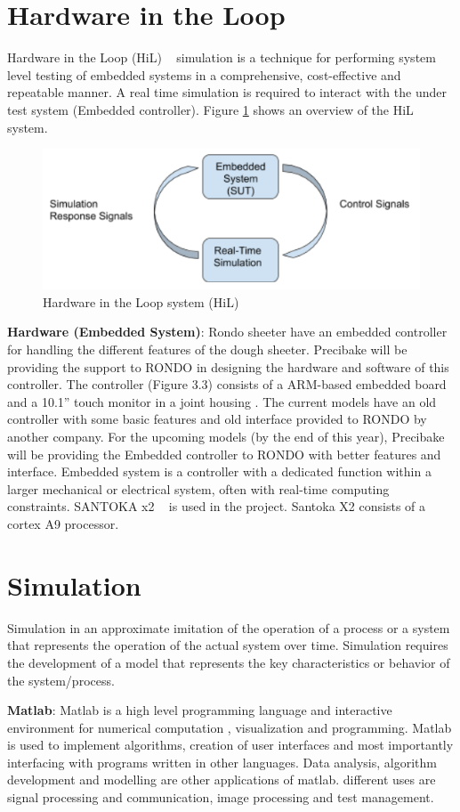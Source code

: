\documentclass{listhesis}
\begin{document}
\section{Hardware in the Loop} Hardware in the Loop (HiL) ~\cite{hil} simulation is a technique for performing system level testing of embedded systems in a comprehensive, cost-effective and repeatable manner. A real time simulation is required to interact with the under test system (Embedded controller). Figure \ref{fig:hil} shows an overview of the HiL system. 
\begin{figure}[h!]


  \includegraphics[width=0.7\linewidth]{hil.png}
  \centering
  \caption{Hardware in the Loop system (HiL)}
  \label{fig:hil}
\end{figure}
\par

\textbf{Hardware (Embedded System)}: Rondo sheeter have an embedded controller for handling the different features of the dough sheeter. Precibake will be providing the support to RONDO in designing the hardware and software of this controller. The controller (Figure 3.3) consists of a ARM-based embedded board and a 10.1” touch monitor in a joint housing . The current models have an old controller with some basic features and old interface provided to RONDO by another company. For the upcoming models (by the end of this year), Precibake will be providing the Embedded controller to RONDO with better features and interface.
Embedded system is a controller with a dedicated function within a larger mechanical or electrical system, often with real-time computing constraints. SANTOKA x2 ~\cite{arm} is used in the project. Santoka X2 consists of a cortex A9 processor. \\
\par
\section{Simulation} Simulation in an approximate imitation of the operation of a process or a system that represents the operation of the actual system over time. Simulation requires the development of a model that represents the key characteristics or behavior of the system/process.
\\
\par
\textbf{Matlab}: Matlab is a high level programming language and interactive environment for numerical computation , visualization and programming. Matlab is used to implement algorithms, creation of user interfaces and most importantly interfacing with programs written in other languages. Data analysis, algorithm development and modelling are other applications of matlab. different uses are signal processing and communication, image processing and test management.\\
\end{document}
